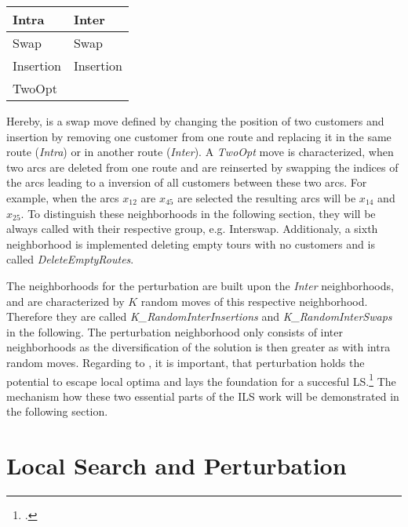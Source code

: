 \begin{table}
    \centering
    \begin{tabular}{@{}P{0.3\textwidth}P{0.3\textwidth}@{}}
        \toprule
        \textbf{Intra} & \textbf{Inter} \\
        \midrule
        Swap           & Swap           \\
        Insertion      & Insertion      \\
        TwoOpt         &                \\
        \bottomrule
    \end{tabular}
\end{table}
Hereby, is a swap move defined by changing the position of two customers and insertion by removing one customer from one route
and replacing it in the same route (\textit{Intra}) or in another route (\textit{Inter}). A \textit{TwoOpt} move is characterized, when two arcs are deleted
from one route and are reinserted by swapping the indices of the arcs leading to a inversion of all customers between these two arcs.
For example, when the arcs $x_{12}$ are $x_{45}$ are selected the resulting arcs will be $x_{14}$ and $x_{25}$. To distinguish these
neighborhoods in the following section, they will be always called with their respective group, e.g. Interswap. Additionaly, a sixth
neighborhood is implemented deleting empty tours with no customers and is called \textit{DeleteEmptyRoutes}.

\parbreak

The neighborhoods for the perturbation are built upon the \textit{Inter} neighborhoods, and are characterized by $K$ random moves of
this respective neighborhood. Therefore they are called \textit{K\_RandomInterInsertions} and \textit{K\_RandomInterSwaps} in the
following. The perturbation neighborhood only consists of inter neighborhoods as the diversification of the solution is then
greater as with intra random moves. Regarding to \cite{lourenco_iterated_2003}, it is important, that perturbation holds the potential
to escape local optima and lays the foundation for a succesful \gls{LS}.\footcite[cf.][pp. 329f.]{lourenco_iterated_2003} The mechanism
how these two essential parts of the \gls{ILS} work will be demonstrated in the following section.

\section{Local Search and Perturbation}
\label{sec:LSandPerturbation}

